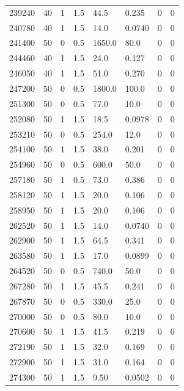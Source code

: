 \documentclass[preview]{standalone}
\begin{document}
{{{{{{\begin{tabular}{L{1.2cm}C{1.2cm} C{0.3cm}C{0.5cm} C{1.4cm}C{1.4cm} C{1.4cm}C{1.4cm}}
  239240  &    40  & 1     & 1.5 &  44.5  & 0.235  & 0 &  0   \\ 
  240780  &    40  & 1     & 1.5 &  14.0  & 0.0740  & 0 &  0   \\ 
  241400  &    50  & 0     & 0.5 &  1650.0  & 80.0  & 0 &  0   \\ 
  244460  &    40  & 1     & 1.5 &  24.0  & 0.127  & 0 &  0   \\ 
  246050  &    40  & 1     & 1.5 &  51.0  & 0.270  & 0 &  0   \\ 
  247200  &    50  & 0     & 0.5 &  1800.0  & 100.0  & 0 &  0   \\ 
  251300  &    50  & 0     & 0.5 &  77.0  & 10.0  & 0 &  0   \\ 
  252080  &    50  & 1     & 1.5 &  18.5  & 0.0978  & 0 &  0   \\ 
  253210  &    50  & 0     & 0.5 &  254.0  & 12.0  & 0 &  0   \\ 
  254100  &    50  & 1     & 1.5 &  38.0  & 0.201  & 0 &  0   \\ 
  254960  &    50  & 0     & 0.5 &  600.0  & 50.0  & 0 &  0   \\ 
  257180  &    50  & 1     & 0.5 &  73.0  & 0.386  & 0 &  0   \\ 
  258120  &    50  & 1     & 1.5 &  20.0  & 0.106  & 0 &  0   \\ 
  258950  &    50  & 1     & 1.5 &  20.0  & 0.106  & 0 &  0   \\ 
  262520  &    50  & 1     & 1.5 &  14.0  & 0.0740  & 0 &  0   \\ 
  262900  &    50  & 1     & 1.5 &  64.5  & 0.341  & 0 &  0   \\ 
  263580  &    50  & 1     & 1.5 &  17.0  & 0.0899  & 0 &  0   \\ 
  264520  &    50  & 0     & 0.5 &  740.0  & 50.0  & 0 &  0   \\ 
  267280  &    50  & 1     & 1.5 &  45.5  & 0.241  & 0 &  0   \\ 
  267870  &    50  & 0     & 0.5 &  330.0  & 25.0  & 0 &  0   \\ 
  270000  &    50  & 0     & 0.5 &  80.0  & 10.0  & 0 &  0   \\ 
  270600  &    50  & 1     & 1.5 &  41.5  & 0.219  & 0 &  0   \\ 
  272190  &    50  & 1     & 1.5 &  32.0  & 0.169  & 0 &  0   \\ 
  272900  &    50  & 1     & 1.5 &  31.0  & 0.164  & 0 &  0   \\ 
  274300  &    50  & 1     & 1.5 &  9.50  & 0.0502  & 0 &  0   \\ 
\hline 
\end{tabular} 

}}}}}}
\end{document}
